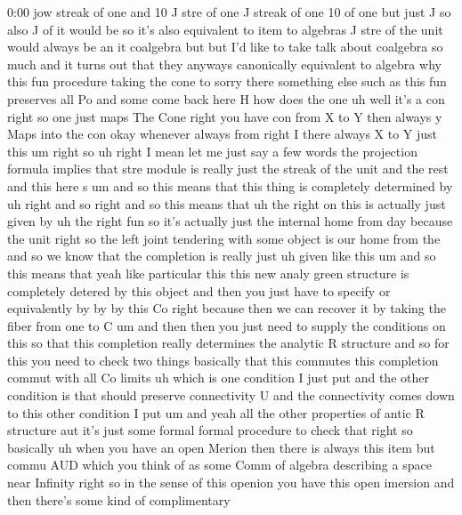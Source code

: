 \begin{unfinished}{0:00}
jow  streak  of  one  and  10  J  stre  of
one  J  streak  of  one  10  of
one  but  just
J  so  also  J  of  it  would
be  so  it's  also  equivalent  to  item  to
algebras  J  stre  of  the  unit  would  always
be  an  it  coalgebra  but  but  I'd  like  to
take  talk  about  coalgebra  so  much  and  it
turns  out  that  they  anyways  canonically
equivalent  to  algebra  why  this  fun
procedure  taking  the  cone
to
sorry  there  something
else  such  as  this  fun  preserves  all
Po  and
some  come  back
here
H  how  does  the
one  uh  well  it's  a  con  right  so  one  just
maps  The  Cone  right  you  have  con  from  X
to  Y  then  always  y  Maps  into  the  con
okay
whenever  always
from  right  I  there  always  X  to
Y  just
this
um  right
so
uh  right  I
mean  let  me  just  say  a  few
words  the  projection
formula  implies  that
stre
module  is  really  just  the  streak  of  the
unit  and  the
rest  and  this  here
s
um  and  so  this  means
that  this  thing  is  completely  determined
by
uh  right  and  so  right  and  so  this  means
that  uh  the  right
on  this  is  actually  just  given
by  uh  the  right  fun  so  it's  actually
just  the  internal  home  from  day  because
the
unit  right  so  the  left  joint  tendering
with  some  object  is  our  home  from
the  and  so  we  know  that  the  completion
is  really  just  uh  given  like  this  um  and
so  this  means  that  yeah  like  particular
this  this  new  analy  green  structure  is
completely  detered  by  this  object  and
then  you  just  have  to  specify  or
equivalently  by  by  by  this  Co  right
because  then  we  can  recover  it  by  taking
the  fiber  from  one  to
C  um  and  then  then  you  just  need  to
supply  the  conditions  on  this  so  that
this  completion  really  determines  the
analytic  R  structure  and  so  for  this  you
need  to  check  two  things  basically  that
this  commutes  this  completion  commut
with  all  Co
limits  uh  which  is  one  condition  I  just
put  and  the  other  condition  is  that
should  preserve  connectivity  U  and  the
connectivity  comes  down  to  this  other
condition  I  put
um
and  yeah  all  the  other  properties  of
antic  R  structure
aut  it's  just  some
formal  formal  procedure  to  check
that  right  so  basically
uh  when  you  have  an  open  Merion  then
there  is  always  this  item  but  commu  AUD
which  you  think  of  as  some  Comm  of
algebra  describing  a  space  near  Infinity
right  so  in  the  sense  of  this  openion
you  have  this  open  imersion  and  then
there's  some  kind  of  complimentary

\end{unfinished}
